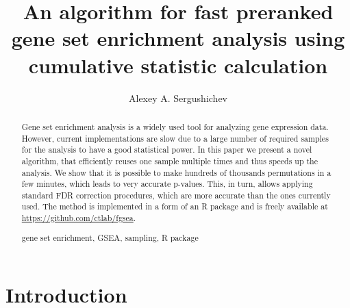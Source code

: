 \documentclass[runningheads,a4paper]{llncs}
\newcommand{\keywords}[1]{\par\addvspace\baselineskip
\noindent\keywordname\enspace\ignorespaces#1}
\begin{document}
\mainmatter  %

\title{An algorithm for fast preranked gene set enrichment analysis using 
    cumulative statistic calculation}


%
\author{Alexey A. Sergushichev}
%


%
%

\maketitle

\begin{abstract}
Gene set enrichment analysis is a widely used tool for analyzing gene 
expression data. However, current implementations are slow due to a large
number of required samples for the analysis to have a good statistical power.
In this paper we present a novel algorithm, that efficiently reuses
one sample multiple times and thus speeds up the analysis.
We show that it is possible to make hundreds of thousands permutations 
in a few minutes, which leads to very accurate p-values. This, in turn,
allows applying standard FDR correction procedures, which are
more accurate than the ones currently used.
The method is implemented in a form of an R package and 
is freely available at \url{https://github.com/ctlab/fgsea}.

\keywords{gene set enrichment, GSEA, sampling, R package}
\end{abstract}


\section{Introduction}
\end{document}
